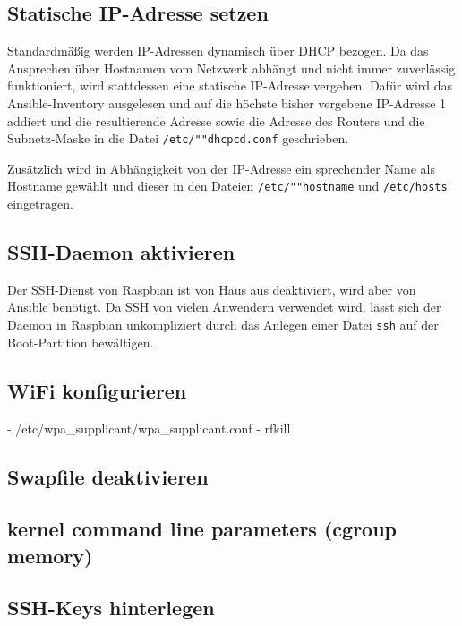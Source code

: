 \subsection{Statische IP-Adresse setzen}

Standardmäßig werden IP-Adressen dynamisch über DHCP bezogen.
Da das Ansprechen über Hostnamen vom Netzwerk abhängt und nicht immer zuverlässig funktioniert, wird stattdessen eine statische IP-Adresse vergeben.
Dafür wird das Ansible-Inventory ausgelesen und auf die höchste bisher vergebene IP-Adresse 1 addiert und die resultierende Adresse sowie die Adresse des Routers und die Subnetz-Maske in die Datei \texttt{/etc/""dhcpcd.conf} geschrieben.

Zusätzlich wird in Abhängigkeit von der IP-Adresse ein sprechender Name als Hostname gewählt und dieser in den Dateien \texttt{/etc/""hostname} und \texttt{/etc/hosts} eingetragen.

\subsection{SSH-Daemon aktivieren}

Der SSH-Dienst von Raspbian ist von Haus aus deaktiviert, wird aber von Ansible benötigt.
Da SSH von vielen Anwendern verwendet wird, lässt sich der Daemon in Raspbian unkompliziert durch das Anlegen einer Datei \texttt{ssh} auf der Boot-Partition bewältigen.

\subsection{WiFi konfigurieren}

- /etc/wpa_supplicant/wpa_supplicant.conf
- rfkill

\subsection{Swapfile deaktivieren}



\subsection{kernel command line parameters (cgroup memory)}



\subsection{SSH-Keys hinterlegen}




